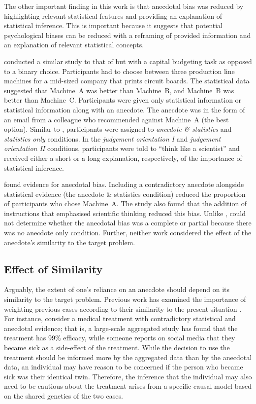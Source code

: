 \documentclass[a4paper, nobind]{templates/ociamthesis}
\theoremstyle{definition}
\theoremstyle{definition}
\theoremstyle{definition}
\theoremstyle{definition}
\theoremstyle{remark}
\begin{document}
The other important finding in this work is that anecdotal bias was reduced by
highlighting relevant statistical features and providing an explanation of
statistical inference. This is important because it suggests that potential
psychological biases can be reduced with a reframing of provided information and
an explanation of relevant statistical concepts.

\textcite{wainberg2018} conducted a similar study to that of \textcite{wainberg2013} but with a
capital budgeting task as opposed to a binary choice. Participants had to choose
between three production line machines for a mid-sized company that prints
circuit boards. The statistical data suggested that Machine~A was better than
Machine~B, and Machine~B was better than Machine~C. Participants were given only
statistical information or statistical information along with an anecdote. The
anecdote was in the form of an email from a colleague who recommended against
Machine~A (the best option). Similar to \textcite{wainberg2013}, participants were
assigned to \emph{anecdote \& statistics} and \emph{statistics only} conditions. In the
\emph{judgement orientation I} and \emph{judgement orientation II} conditions,
participants were told to ``think like a scientist'' and received either a short
or a long explanation, respectively, of the importance of statistical inference.

\textcite{wainberg2018} found evidence for anecdotal bias. Including a contradictory
anecdote alongside statistical evidence (the anecdote \& statistics condition)
reduced the proportion of participants who chose Machine~A. The study also found
that the addition of instructions that emphasised scientific thinking reduced
this bias. Unlike \textcite{wainberg2013}, \textcite{wainberg2018} could not determine whether the
anecdotal bias was a complete or partial because there was no anecdote only
condition. Further, neither work considered the effect of the anecdote's
similarity to the target problem.

\hypertarget{effect-of-similarity}{%
\subsection{Effect of Similarity}\label{effect-of-similarity}}

Arguably, the extent of one's reliance on an anecdote should depend on its
similarity to the target problem. Previous work has examined the importance of
weighting previous cases according to their similarity to the present situation
\autocite{gilboa1995,lovallo2012}. For instance, consider a medical treatment with
contradictory statistical and anecdotal evidence; that is, a large-scale
aggregated study has found that the treatment has 99\% efficacy, while someone
reports on social media that they became sick as a side-effect of the treatment.
While the decision to use the treatment should be informed more by the
aggregated data than by the anecdotal data, an individual may have reason to be
concerned if the person who became sick was their identical twin. Therefore, the
inference that the individual may also need to be cautious about the treatment
arises from a specific causal model based on the shared genetics of the two
cases.
\end{document}
